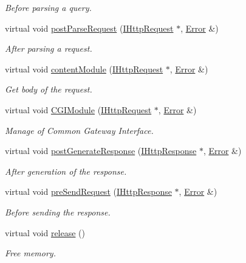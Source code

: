 \begin{DoxyCompactItemize}
\begin{DoxyCompactList}\small\item\em Before parsing a query. \end{DoxyCompactList}\item 
virtual void \hyperlink{classapimeal_1_1AModule_a2826a882eda9e5e7b5b6ca6b1051a479}{post\-Parse\-Request} (\hyperlink{classapimeal_1_1IHttpRequest}{I\-Http\-Request} $\ast$, \hyperlink{structapimeal_1_1Error}{Error} \&)
\begin{DoxyCompactList}\small\item\em After parsing a request. \end{DoxyCompactList}\item 
virtual void \hyperlink{classapimeal_1_1AModule_a01660e7d5ed59a20e9a81e03958a9911}{content\-Module} (\hyperlink{classapimeal_1_1IHttpRequest}{I\-Http\-Request} $\ast$, \hyperlink{structapimeal_1_1Error}{Error} \&)
\begin{DoxyCompactList}\small\item\em Get body of the request. \end{DoxyCompactList}\item 
virtual void \hyperlink{classapimeal_1_1AModule_a2f80e5e88df077200e42f70c79083819}{C\-G\-I\-Module} (\hyperlink{classapimeal_1_1IHttpRequest}{I\-Http\-Request} $\ast$, \hyperlink{structapimeal_1_1Error}{Error} \&)
\begin{DoxyCompactList}\small\item\em Manage of Common Gateway Interface. \end{DoxyCompactList}\item 
virtual void \hyperlink{classapimeal_1_1AModule_ab245f944a40f67dddb5777864677468d}{post\-Generate\-Response} (\hyperlink{classapimeal_1_1IHttpResponse}{I\-Http\-Response} $\ast$, \hyperlink{structapimeal_1_1Error}{Error} \&)
\begin{DoxyCompactList}\small\item\em After generation of the response. \end{DoxyCompactList}\item 
virtual void \hyperlink{classapimeal_1_1AModule_a07990bc98a4b3a90ecbc328b588af66f}{pre\-Send\-Request} (\hyperlink{classapimeal_1_1IHttpResponse}{I\-Http\-Response} $\ast$, \hyperlink{structapimeal_1_1Error}{Error} \&)
\begin{DoxyCompactList}\small\item\em Before sending the response. \end{DoxyCompactList}\item 
\hypertarget{classapimeal_1_1AModule_adc7136919b05fbde2f0f3b4d3d1bc844}{virtual void \hyperlink{classapimeal_1_1AModule_adc7136919b05fbde2f0f3b4d3d1bc844}{release} ()}\label{classapimeal_1_1AModule_adc7136919b05fbde2f0f3b4d3d1bc844}

\begin{DoxyCompactList}\small\item\em Free memory. \end{DoxyCompactList}\end{DoxyCompactItemize}
